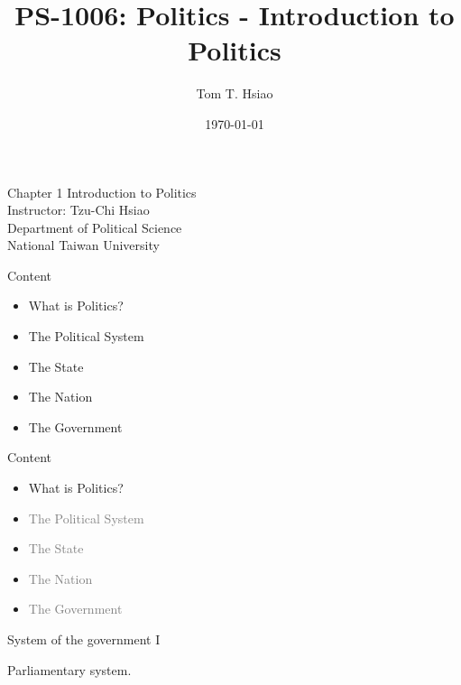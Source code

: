 \documentclass{beamer}
\title{PS-1006: Politics - Introduction to Politics}
\author{Tom T. Hsiao}
\date{\today}
\begin{document}
\begin{frame}
\begin{center}
\Large{Chapter 1 Introduction to Politics} \\
\vspace{3em}
\normalsize{Instructor: Tzu-Chi Hsiao} \\
\vspace{3em}
\small{Department of Political Science} \\
\vspace{1em}
\small{National Taiwan University} \\
\end{center}
\end{frame}
\begin{frame}{Content}
\begin{itemize}
\item What is Politics?
\item The Political System
\item The State
\item The Nation
\item The Government
\end{itemize}
\end{frame}
\begin{frame}{Content}
\begin{itemize}
\item What is Politics?
\item \textcolor{gray}{The Political System}
\item \textcolor{gray}{The State}
\item \textcolor{gray}{The Nation}
\item \textcolor{gray}{The Government}
\end{itemize}
\end{frame}
\begin{frame}{System of the government I}
\begin{center}
\end{center}
\begin{center}
Parliamentary system.
\end{center}
\end{frame}
\end{document}
